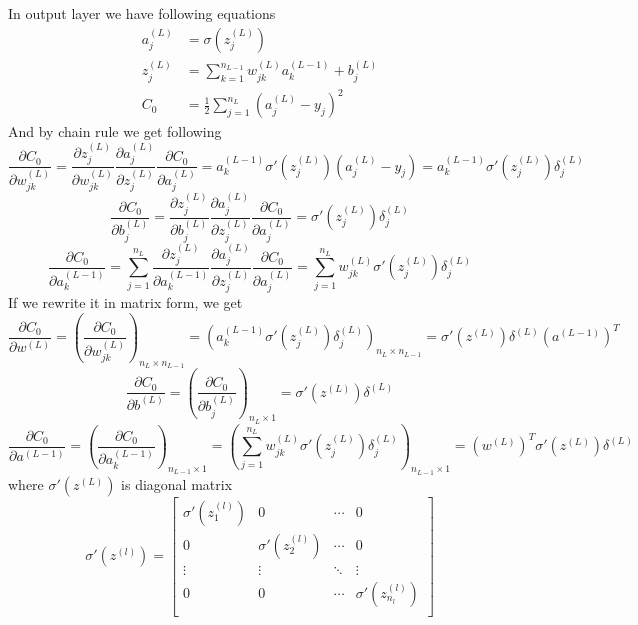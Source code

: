 \documentclass{article}
\numberwithin{equation}{section}
\theoremstyle{definition}
\theoremstyle{remark}
\begin{document}
In output layer we have following equations
\begin{align}
a_{j}^{(L)} &= \sigma \left( z_{j}^{(L)} \right) \\
z_{j}^{(L)} &= \sum_{k=1}^{n_{L-1}} w_{jk}^{(L)} a_{k}^{(L-1)} + b_{j}^{(L)} \\
C_{0} &= \frac{1}{2} \sum_{j=1}^{n_{L}} \left( a_{j}^{(L)} - y_{j} \right)^2
\end{align}
And by chain rule we get following
\[
    \frac{\partial C_{0}}{\partial w_{jk}^{(L)}} =
    \frac{\partial z_{j}^{(L)}}{\partial w_{jk}^{(L)}}
    \frac{\partial a_{j}^{(L)}}{\partial z_{j}^{(L)}}
    \frac{\partial C_{0}}{\partial a_{j}^{(L)}} =
    a_{k}^{(L-1)} \sigma' \left( z_{j}^{(L)} \right)
    \left( a_{j}^{(L)} - y_{j} \right) =
    a_{k}^{(L-1)} \sigma' \left( z_{j}^{(L)} \right)\delta_{j}^{(L)}
\]
\[
    \frac{\partial C_{0}}{\partial b_{j}^{(L)}} =
    \frac{\partial z_{j}^{(L)}}{\partial b_{j}^{(L)}}
    \frac{\partial a_{j}^{(L)}}{\partial z_{j}^{(L)}}
    \frac{\partial C_{0}}{\partial a_{j}^{(L)}} =
    \sigma' \left( z_{j}^{(L)} \right)\delta_{j}^{(L)}
\]
\[
    \frac{\partial C_{0}}{\partial a_{k}^{(L-1)}} =
    \sum_{j=1}^{n_{L}}
    \frac{\partial z_{j}^{(L)}}{\partial a_{k}^{(L-1)}}
    \frac{\partial a_{j}^{(L)}}{\partial z_{j}^{(L)}}
    \frac{\partial C_{0}}{\partial a_{j}^{(L)}} =
    \sum_{j=1}^{n_{L}}
    w_{jk}^{(L)} \sigma' \left( z_{j}^{(L)} \right) \delta_{j}^{(L)}
\]
If we rewrite it in matrix form, we get
\[
    \frac{\partial C_{0}}{\partial w^{(L)}} =
    \left(  \frac{\partial C_{0}}{\partial w_{jk}^{(L)}} \right)_{n_{L}\times n_{L-1}}=
    \left( a_{k}^{(L-1)} \sigma' \left( z_{j}^{(L)} \right)\delta_{j}^{(L)}  \right)_{n_{L}\times n_{L-1}}
    = \sigma' \left( z^{(L)} \right)\delta^{(L)} \left(  a^{(L-1)} \right) ^T
\]\[
    \frac{\partial C_{0}}{\partial b^{(L)}} =
    \left(  \frac{\partial C_{0}}{\partial b_{j}^{(L)}} \right)_{n_{L}\times 1} =
    \sigma' \left( z^{(L)} \right)\delta^{(L)}
\]\[
    \frac{\partial C_{0}}{\partial a^{(L-1)}} =
    \left(  \frac{\partial C_{0}}{\partial a_{k}^{(L-1)}} \right)_{n_{L-1}\times 1}=
    \left(  \sum_{j=1}^{n_{L}} w_{jk}^{(L)} \sigma' \left( z_{j}^{(L)} \right) \delta_{j}^{(L)} \right)_{n_{L-1}\times 1}=
    \left(  w^{(L)} \right)^T \sigma' \left( z^{(L)} \right)\delta^{(L)}
\]
where $\sigma'(z^{(L)})$ is diagonal matrix
\[
    \sigma'(z^{(l)}) = \begin{bmatrix}
        \sigma' \left( z_1^{(l)} \right)  & 0 & \cdots & 0 \\
        0 & \sigma' \left( z_2^{(l)} \right) & \cdots & 0 \\
        \vdots & \vdots & \ddots & \vdots \\
        0 & 0 & \cdots &\sigma' \left( z_{n_{l}}^{(l)} \right) \\
    \end{bmatrix}
\]
\end{document}
